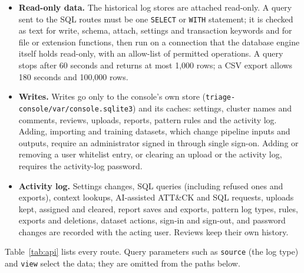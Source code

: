 \documentclass[11pt,a4paper]{article}
\begin{document}
\begin{itemize}
\item \textbf{Read-only data.} The historical log stores are attached read-only. A query sent to the SQL routes must be one \nolinkurl{SELECT} or \nolinkurl{WITH} statement; it is checked as text for write, schema, attach, settings and transaction keywords and for file or extension functions, then run on a connection that the database engine itself holds read-only, with an allow-list of permitted operations. A query stops after 60 seconds and returns at most 1,000 rows; a CSV export allows 180 seconds and 100,000 rows.
\item \textbf{Writes.} Writes go only to the console's own store (\nolinkurl{triage-console/var/console.sqlite3}) and its caches: settings, cluster names and comments, reviews, uploads, reports, pattern rules and the activity log. Adding, importing and training datasets, which change pipeline inputs and outputs, require an administrator signed in through single sign-on. Adding or removing a user whitelist entry, or clearing an upload or the activity log, requires the activity-log password.
\item \textbf{Activity log.} Settings changes, SQL queries (including refused ones and exports), context lookups, AI-assisted ATT\&CK and SQL requests, uploads kept, assigned and cleared, report saves and exports, pattern log types, rules, exports and deletions, dataset actions, sign-in and sign-out, and password changes are recorded with the acting user. Reviews keep their own history.
\end{itemize}

Table~\ref{tab:api} lists every route. Query parameters such as \nolinkurl{source} (the log type) and \nolinkurl{view} select the data; they are omitted from the paths below.
\end{document}
